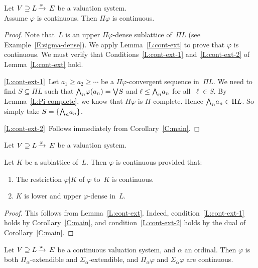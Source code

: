 \documentclass[main.tex]{subfiles}
\begin{document}
%
%
\begin{lem}
\label{lem:cont-ext-single}
Let $V \supseteq L\,\smash{\xrightarrow{\varphi}\,E}$ be a valuation system.\\
Assume $\varphi$ is continuous.
Then $\Pi \varphi$ is continuous.
\end{lem}
\begin{proof}
Note that~$L$ is an
upper $\Pi\varphi$-dense sublattice of~$\Pi L$
(see Example~\ref{E:sigma-dense}).
We apply Lemma~\ref{L:cont-ext}
to prove that $\varphi$ is continuous.
We must verify that Conditions~\ref{L:cont-ext-1}
and~\ref{L:cont-ext-2} of Lemma~\ref{L:cont-ext} hold.

\ref{L:cont-ext-1}\ 
Let $a_1 \geq a_2 \geq \dotsb$ be a $\Pi\varphi$-convergent
sequence in~$\Pi L$.
We need to find $S\subseteq \Pi L$
such that $\textstyle{\bigwedge}_n \varphi(a_n) = \textstyle{\bigvee} S$
and $\ell \leq \textstyle{\bigwedge}_n a_n$ for all~$\ell \in S$.
By Lemma~\ref{L:Pi-complete},
we know that
$\Pi\varphi$ is $\Pi$-complete.
Hence $\textstyle{\bigwedge}_n a_n \in \Pi L$.
So simply take $S=\{ \textstyle{\bigwedge}_n a_n \}$.

\ref{L:cont-ext-2}\ 
Follows immediately from Corollary~\ref{C:main}.
\end{proof}
%
%
\begin{lem}
\label{lem:cont-ext-double}
Let $V \supseteq L\,\smash{\xrightarrow{\varphi}\,E}$ be a valuation system.

Let $K$ be a sublattice of~$L$.
Then $\varphi$ is continuous provided that:
\begin{enumerate}
\item
The restriction $\varphi|K$ of $\varphi$ to~$K$ is continuous.
\item
$K$ is lower and upper $\varphi$-dense in~$L$.
\end{enumerate}
\end{lem}
\begin{proof}
This follows from Lemma~\ref{L:cont-ext}.
Indeed, condition~\ref{L:cont-ext-1} holds
by Corollary~\ref{C:main},
and condition~\ref{L:cont-ext-2} holds
by the dual of Corollary~\ref{C:main}.
\end{proof}
%
%
\begin{lem}
\label{L:fitting-ext}
Let $V \supseteq L\,\smash{\xrightarrow{\varphi}\,E}$ be a continuous valuation system,
and $\alpha$ an ordinal.
Then $\varphi$ is both $\Pi_\alpha$-extendible
and $\Sigma_\alpha$-extendible,
and $\Pi_\alpha\varphi$ and $\Sigma_\alpha\varphi$
are continuous.
\end{lem}
\end{document}
